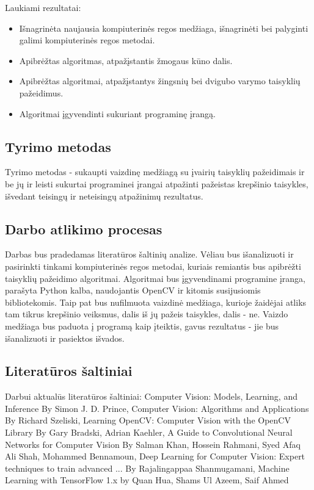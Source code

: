 \documentclass{VUMIFPSbakalaurinis}
\begin{document}
Laukiami rezultatai:
\begin{itemize}[topsep=5pt,itemsep=-1ex,partopsep=2ex,parsep=2ex]
 \item Išnagrinėta naujausia kompiuterinės regos medžiaga, išnagrinėti bei palyginti galimi kompiuterinės regos metodai.
 \item Apibrėžtas algoritmas, atpažįstantis žmogaus kūno dalis.
 \item Apibrėžtas algoritmai, atpažįstantys žingsnių bei dvigubo varymo taisyklių pažeidimus.
 \item Algoritmai įgyvendinti sukuriant programinę įrangą.
\end{itemize}

\subsection{Tyrimo metodas}
Tyrimo metodas - sukaupti vaizdinę medžiagą su įvairių taisyklių pažeidimais ir be jų ir leisti sukurtai programinei įrangai atpažinti pažeistas krepšinio taisykles, išvedant teisingų ir neteisingų atpažinimų rezultatus.

\subsection{Darbo atlikimo procesas}
Darbas bus pradedamas literatūros šaltinių analize. Vėliau bus išanalizuoti ir pasirinkti tinkami kompiuterinės regos metodai, kuriais remiantis bus apibrėžti taisyklių pažeidimo algoritmai. Algoritmai bus įgyvendinami programine įranga, parašyta Python kalba, naudojantis OpenCV ir kitomis susijusiomis bibliotekomis. Taip pat bus nufilmuota vaizdinė medžiaga, kurioje žaidėjai atliks tam tikrus krepšinio veiksmus, dalis iš jų pažeis taisykles, dalis - ne. Vaizdo medžiaga bus paduota į programą kaip įteiktis, gavus rezultatus - jie bus išanalizuoti ir pasiektos išvados. 

\subsection{Literatūros šaltiniai}
Darbui aktualūs literatūros šaltiniai: Computer Vision: Models, Learning, and Inference By Simon J. D. Prince, Computer Vision: Algorithms and Applications By Richard Szeliski, 
Learning OpenCV: Computer Vision with the OpenCV Library By Gary Bradski, Adrian Kaehler, A Guide to Convolutional Neural Networks for Computer Vision
By Salman Khan, Hossein Rahmani, Syed Afaq Ali Shah, Mohammed Bennamoun, Deep Learning for Computer Vision: Expert techniques to train advanced ...
By Rajalingappaa Shanmugamani, Machine Learning with TensorFlow 1.x by Quan Hua, Shams Ul Azeem, Saif Ahmed
\end{document}
